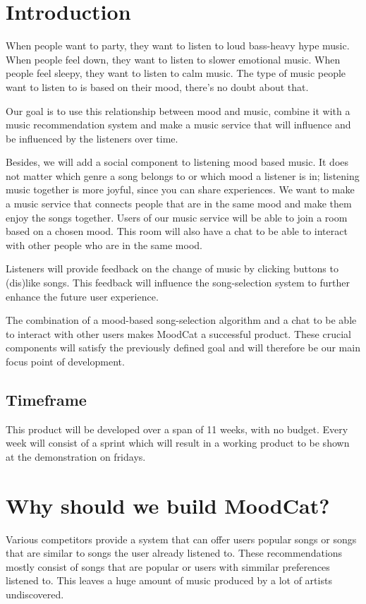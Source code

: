 \chapter{Introduction}

When people want to party, they want to listen to loud bass-heavy hype music.
When people feel down, they want to listen to slower emotional music.
When people feel sleepy, they want to listen to calm music.
The type of music people want to listen to is based on their mood, there's no doubt about that.

Our goal is to use this relationship between mood and music,
combine it with a music recommendation system and make a music service
that will influence and be influenced by the listeners over time.

Besides, we will add a social component to listening mood based music.
It does not matter which genre a song belongs to or which mood a listener is in; 
listening music together is more joyful, since you can share experiences.
We want to make a music service that connects people that are in the same mood and make them enjoy the songs together.
Users of our music service will be able to join a room based on a chosen mood.
This room will also have a chat to be able to interact with other people who are in the same mood.

Listeners will provide feedback on the change of music by clicking buttons to (dis)like songs.
This feedback will influence the song-selection system to further enhance the future user experience.

The combination of a mood-based song-selection algorithm and a chat to be able to interact with other users makes MoodCat a successful product.
These crucial components will satisfy the previously defined goal and will therefore be our main focus point of development.

\section{Timeframe}
This product will be developed over a span of 11 weeks, with no budget.
Every week will consist of a sprint which will result in a working product to be shown at the demonstration on fridays.

\chapter{Why should we build MoodCat?}
Various competitors provide a system that can offer users popular songs or songs that are similar to songs the user already listened to.
These recommendations mostly consist of songs that are popular or users with simmilar preferences listened to.
This leaves a huge amount of music produced by a lot of artists undiscovered.

